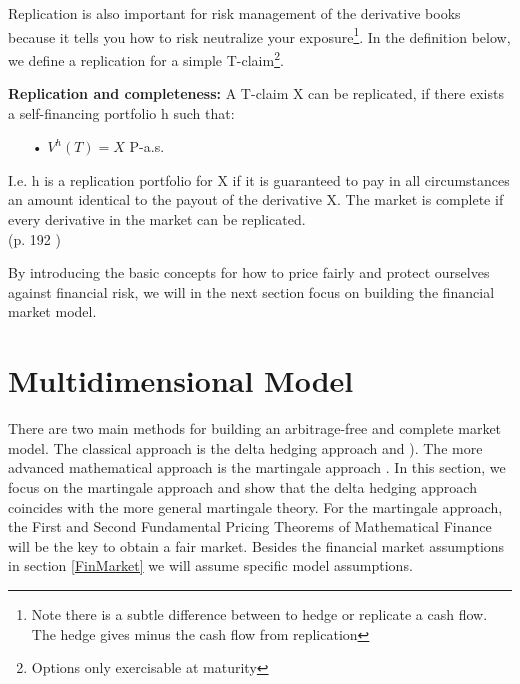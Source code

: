 Replication is also important for risk management of the derivative books because it tells you how to risk neutralize your exposure\footnote{Note there is a subtle difference between to hedge or replicate a cash flow. The hedge gives minus the cash flow from replication}. In the definition below, we define a replication for a simple T-claim\footnote{Options only exercisable at maturity}.
\theoremstyle{definition}
\begin{definition}{\textbf{Replication and completeness: }}
A T-claim X can be replicated, if there exists a self-financing portfolio h such that:
\begin{enumerate}
\item[•] $V^{h}(T)=X$ P-a.s.
\end{enumerate}
I.e. h is a replication portfolio for X if it is guaranteed to pay in all circumstances an amount identical to the payout of the derivative X.
The market is complete if every derivative in the market can be replicated.\\
\null \hfill (p. 192 \parencite{finKont})
\end{definition}

By introducing the basic concepts for how to price fairly and protect ourselves against financial risk, we will in the next section focus on building the financial market model.


\section{Multidimensional Model}\label{MultiDimModel}
There are two main methods for building an arbitrage-free and complete market model. The classical approach is the delta hedging approach \parencite{B-S-Paper} and \parencite{CRR}). The more advanced mathematical approach is the martingale approach  \parencite{finKont}. In this section, we focus on the martingale approach and show that the delta hedging approach coincides with the more general martingale theory. For the martingale approach, the First and Second Fundamental Pricing Theorems of Mathematical Finance will be the key to obtain a fair market. Besides the financial market assumptions in section \ref{FinMarket} we will assume specific model assumptions.

